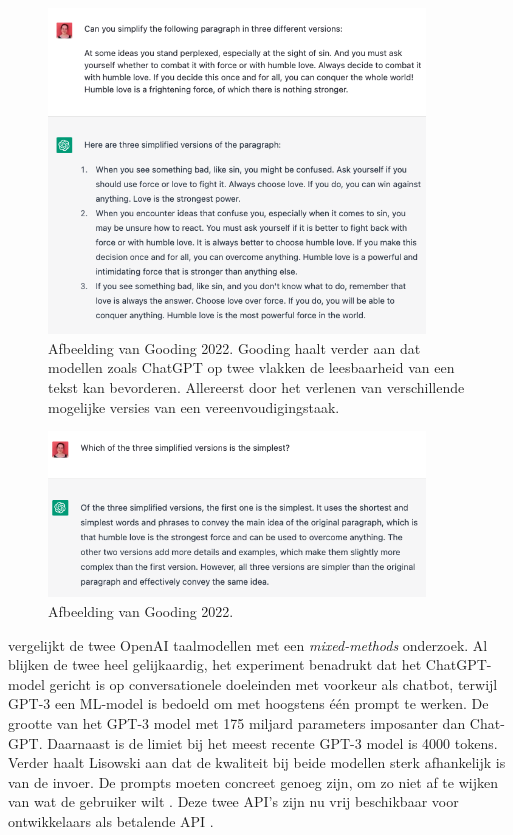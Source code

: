 \begin{figure}[H]
	\includegraphics[width=10cm]{img/chatgpt-example-different-versions-gooding.png}
	\caption{Afbeelding van Gooding 2022. Gooding haalt verder aan dat modellen zoals ChatGPT op twee vlakken de leesbaarheid van een tekst kan bevorderen. Allereerst door het verlenen van verschillende mogelijke versies van een vereenvoudigingstaak.}
\end{figure}

\begin{figure}[H]
	\includegraphics[width=10cm]{img/chatgpt-example-evaluation-gooding.png}
	\caption{Afbeelding van Gooding 2022.}
\end{figure}

\textcite{Lisowski2023} vergelijkt de twee OpenAI taalmodellen met een \textit{mixed-methods} onderzoek. Al blijken de twee heel gelijkaardig, het experiment benadrukt dat het ChatGPT-model gericht is op conversationele doeleinden met voorkeur als chatbot, terwijl GPT-3 een ML-model is bedoeld om met hoogstens één prompt te werken. De grootte van het GPT-3 model met 175 miljard parameters imposanter dan Chat-GPT. Daarnaast is de limiet bij het meest recente GPT-3 model is 4000 tokens. Verder haalt Lisowski aan dat de kwaliteit bij beide modellen sterk afhankelijk is van de invoer. De prompts moeten concreet genoeg zijn, om zo niet af te wijken van wat de gebruiker wilt \autocite{Lisowski2023}. Deze twee API's zijn nu vrij beschikbaar voor ontwikkelaars als betalende API \autocite{Brockman2023}.

